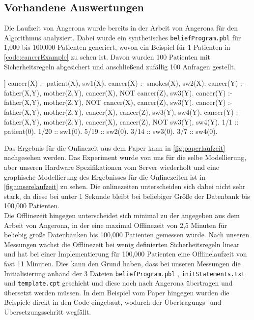 \documentclass[german,version-2020-11]{uzl-thesis}
\begin{document}
\subsection{Vorhandene Auswertungen}
Die Laufzeit von Angerona wurde bereits in der Arbeit von Angerona\cite{guarnieri2017securing} für den Algorithmus analysiert. Dabei wurde ein synthetisches \texttt{beliefProgram.pbl} für 1,000 bis 100,000 Patienten generiert, wovon ein Beispiel für 1 Patienten in \autoref{code:cancerExample} zu sehen ist. Davon wurden 100 Patienten mit Sicherheitsregeln abgesichert und anschließend zufällig 100 Anfragen gestellt. \\ 
\begin{Pseudocode}[caption={\texttt{beliefProgram.pbl} für das Beispiel aus dem Paper \cite{6}}, label={code:cancerExample}]]
cancer(X) :- patient(X), sw1(X).
cancer(X) :- smokes(X), sw2(X).
cancer(Y) :- father(X,Y), mother(Z,Y), cancer(X), NOT cancer(Z), sw3(Y).
cancer(Y) :- father(X,Y), mother(Z,Y), NOT cancer(X), cancer(Z), sw3(Y).
cancer(Y) :- father(X,Y), mother(Z,Y), cancer(X), cancer(Z), sw3(Y), sw4(Y).
cancer(Y) :- father(X,Y), mother(Z,Y), cancer(X), cancer(Z), NOT sw3(Y), sw4(Y).
1/1 :: patient(0).
1/20 :: sw1(0).
5/19 :: sw2(0).
3/14 :: sw3(0).
3/7 :: sw4(0).
\end{Pseudocode}
Das Ergebnis für die Onlinezeit aus dem Paper kann in \autoref{fig:paperlaufzeit} nachgesehen werden. Das Experiment wurde von uns für die selbe Modellierung, aber unseren Hardware Spezifikationen vom Server wiederholt und eine graphische Modellierung des Ergebnisses für die Onlinezeiten ist in \autoref{fig:unserelaufzeit} zu sehen. Die onlinezeiten unterscheiden sich dabei nicht sehr stark, da diese bei unter 1 Sekunde bleibt bei beliebiger Größe der Datenbank bis 100,000 Patienten. \\
Die Offlinezeit hingegen unterscheidet sich minimal zu der angegeben aus dem Arbeit von Angerona, in der eine maximal Offlinezeit von 2,5 Minuten für beliebig große Datenbanken bis 100,000 Patienten gemessen wurde. Nach unseren Messungen wächst die Offlinezeit bei wenig definierten Sicherheitsregeln linear und hat bei einer Implementierung für 100,000 Patienten eine Offlinelaufzeit von fast 11 Minuten. Dies kann den Grund haben, dass bei unseren Messungen die Initialisierung anhand der 3 Dateien \texttt{beliefProgram.pbl} , \texttt{initStatements.txt} und \texttt{template.cpt} geschieht und diese noch nach Angerona übertragen und übersetzt werden müssen. In dem Beispiel vom Paper hingegen wurden die Beispiele direkt in den Code eingebaut, wodurch der Übertragungs- und Übersetzungsschritt wegfällt.\\  
\end{document}

